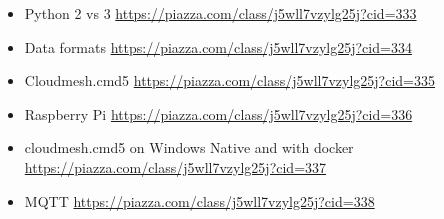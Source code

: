\begin{itemize}
\tightlist
\item
  Python 2 vs 3 \url{https://piazza.com/class/j5wll7vzylg25j?cid=333}
\item
  Data formats \url{https://piazza.com/class/j5wll7vzylg25j?cid=334}
\item
  Cloudmesh.cmd5 \url{https://piazza.com/class/j5wll7vzylg25j?cid=335}
\item
  Raspberry Pi \url{https://piazza.com/class/j5wll7vzylg25j?cid=336}
\item
  cloudmesh.cmd5 on Windows Native and with docker
  \url{https://piazza.com/class/j5wll7vzylg25j?cid=337}
\item
  MQTT \url{https://piazza.com/class/j5wll7vzylg25j?cid=338}
\end{itemize}
